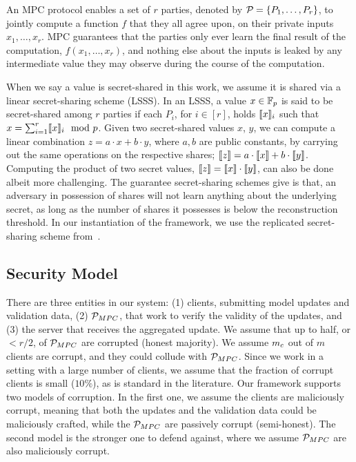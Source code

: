  An MPC protocol enables a set of $r$ parties, denoted by $\mathcal{P}_{} = \{ P_1, \ldots, P_r \}$, to jointly compute a function $f$ that they all agree upon, on their private inputs $x_1, \ldots, x_r$. MPC guarantees that the parties only ever learn the final result of the computation, $f(x_1, \ldots, x_r)$, and nothing else about the inputs is leaked by any intermediate value they may observe during the course of the computation.

 When we say a value is secret-shared in this work, we assume it is shared via a linear secret-sharing scheme (LSSS). In an LSSS, a value $x \in \mathbb{F}_p$ is said to be secret-shared among $r$ parties if each $P_i$, for $i \in [r]$, holds $\llbracket x\rrbracket_i$ such that $x = \sum_{i = 1}^r \llbracket x\rrbracket_i \mod p$. Given two secret-shared values $x$, $y$, we can compute a linear combination $z = a \cdot x + b \cdot y$, where $a, b$ are public constants, by carrying out the same operations on the respective shares; $\llbracket z\rrbracket = a \cdot \llbracket x\rrbracket + b \cdot \llbracket y\rrbracket$. 
Computing the product of two secret values, $\llbracket z\rrbracket = \llbracket x\rrbracket \cdot \llbracket y\rrbracket$, can also be done albeit more challenging. 
The guarantee secret-sharing schemes give is that, an adversary in possession of shares will not learn anything about the underlying secret, as long as the number of shares it possesses is below the reconstruction threshold. In our instantiation of the framework, we use the replicated secret-sharing scheme from~\citet{CCS:AFLNO16}.







\subsection{Security Model}
\label{sec:sec-model}

 There are three entities in our system: (1) clients, submitting model updates and validation data, (2) $\mathcal{P}_{MPC}$, that work to verify the validity of the updates, and (3) the server that receives the aggregated update. 
We assume that up to half, or $< r/2$, of $\mathcal{P}_{MPC}$ are corrupted (\ie honest majority). 
We assume $m_c$ out of $m$ clients are corrupt, and they could collude with $\mathcal{P}_{MPC}$.
Since we work in a setting with a large number of clients, we assume that the fraction of corrupt clients is small (\eg $10\%$), as is standard in the literature.
Our framework supports two models of corruption. In the first one, we assume the clients are maliciously corrupt, meaning that both the updates and the validation data could be maliciously crafted, while the $\mathcal{P}_{MPC}$ are passively corrupt (semi-honest). The second model is the stronger one to defend against, where we assume $\mathcal{P}_{MPC}$ are also maliciously corrupt.


